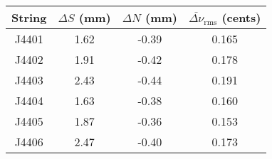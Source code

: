 \begin{tabular}{cccc}
\toprule
String & $\Delta S$ (mm) & $\Delta N$ (mm) & $\overline{\Delta \nu}_\text{rms}$ (cents) \\
\midrule
J4401 & 1.62 & -0.39 & 0.165 \\
J4402 & 1.91 & -0.42 & 0.178 \\
J4403 & 2.43 & -0.44 & 0.191 \\
J4404 & 1.63 & -0.38 & 0.160 \\
J4405 & 1.87 & -0.36 & 0.153 \\
J4406 & 2.47 & -0.40 & 0.173 \\
\bottomrule
\end{tabular}
